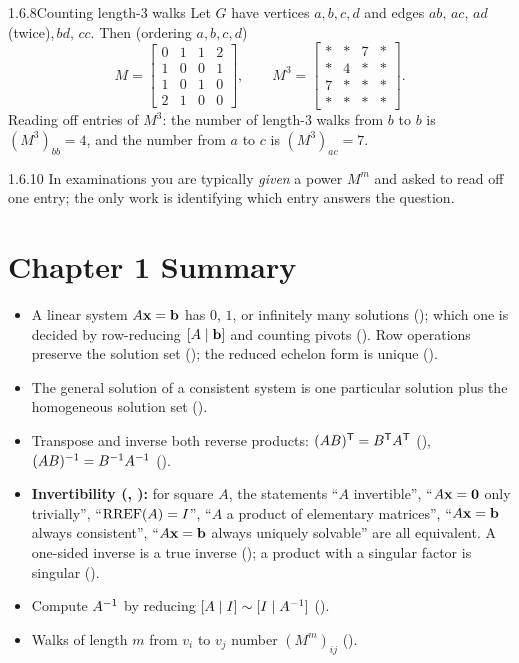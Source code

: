 \begin{exmp}{1.6.8}{Counting length-3 walks}
Let $G$ have vertices $a,b,c,d$ and edges $ab,\,ac,\,ad$ (twice),\,$bd,\,cc$. Then (ordering $a,b,c,d$)
\[
M=\begin{bmatrix}0&1&1&2\\1&0&0&1\\1&0&1&0\\2&1&0&0\end{bmatrix},\qquad
M^3=\begin{bmatrix}\ast&\ast&7&\ast\\ \ast&4&\ast&\ast\\ 7&\ast&\ast&\ast\\ \ast&\ast&\ast&\ast\end{bmatrix}.
\]
Reading off entries of $M^3$: the number of length-$3$ walks from $b$ to $b$ is $(M^3)_{bb}=4$, and the number from $a$ to $c$ is $(M^3)_{ac}=7$.
\end{exmp}

\begin{rmks}{1.6.10}
In examinations you are typically \emph{given} a power $M^m$ and asked to read off one entry; the only work is identifying which entry answers the question.
\end{rmks}

\section*{Chapter 1 Summary}
\begin{itemize}[leftmargin=1.4em,itemsep=2pt]
\item A linear system $A\mathbf{x}=\mathbf{b}$ has $0$, $1$, or infinitely many solutions (); which one is decided by row-reducing $[A\mid\mathbf{b}]$ and counting pivots (). Row operations preserve the solution set (); the reduced echelon form is unique ().
\item The general solution of a consistent system is one particular solution plus the homogeneous solution set ().
\item Transpose and inverse both reverse products: $(AB)^{\mathsf{T}}=B^{\mathsf{T}} A^{\mathsf{T}}$ (), $(AB)^{-1}=B^{-1} A^{-1}$ ().
\item \textbf{Invertibility (, ):} for square $A$, the statements ``$A$ invertible'', ``$A\mathbf{x}=\mathbf{0}$ only trivially'', ``$\operatorname{RREF}(A)=I$'', ``$A$ a product of elementary matrices'', ``$A\mathbf{x}=\mathbf{b}$ always consistent'', ``$A\mathbf{x}=\mathbf{b}$ always uniquely solvable'' are all equivalent. A one-sided inverse is a true inverse (); a product with a singular factor is singular ().
\item Compute $A^{-1}$ by reducing $[A\mid I]\sim[I\mid A^{-1}]$ ().
\item Walks of length $m$ from $v_i$ to $v_j$ number $(M^m)_{ij}$ ().
\end{itemize}

